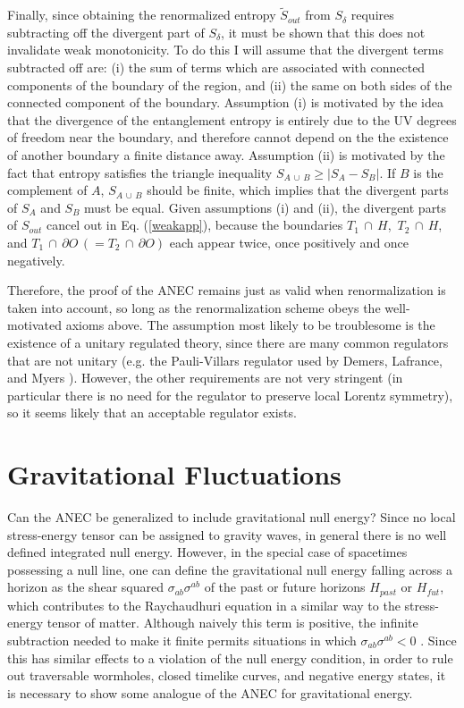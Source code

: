 \documentclass{article}
\begin{document}
Finally, since obtaining the renormalized entropy $\tilde{S}_{out}$ from $S_\delta$ requires subtracting off the divergent part of $S_\delta$, it must be shown that this does not invalidate weak monotonicity.  To do this I will assume that the divergent terms subtracted off are: (i) the sum of terms which are associated with connected components of the boundary of the region, and (ii) the same on both sides of the connected component of the boundary.  Assumption (i) is motivated by the idea that the divergence of the entanglement entropy is entirely due to the UV degrees of freedom near the boundary, and therefore cannot depend on the the existence of another boundary a finite distance away.  Assumption (ii) is motivated by the fact that entropy satisfies the triangle inequality $S_{A\,\cup\,B} \ge |S_A - S_B|$.  If $B$ is the complement of $A$, $S_{A\,\cup\,B}$ should be finite, which implies that the divergent parts of $S_A$ and $S_B$ must be equal.  Given assumptions (i) and (ii), the divergent parts of $S_{out}$ cancel out in Eq. (\ref{weakapp}), because the boundaries $T_1\,\cap\,H$, $\,T_2\,\cap\,H$, and $T_1\,\cap\,\partial O\,(= T_2\,\cap\,\partial O)$ each appear twice, once positively and once negatively.

Therefore, the proof of the ANEC remains just as valid when renormalization is taken into account, so long as the renormalization scheme obeys the well-motivated axioms above.  The assumption most likely to be troublesome is the existence of a unitary regulated theory, since there are many common regulators that are not unitary (e.g. the Pauli-Villars regulator used by Demers, Lafrance, and Myers \cite{FS94}).   However, the other requirements are not very stringent (in particular there is no need for the regulator to preserve local Lorentz symmetry), so it seems likely that an acceptable regulator exists.

\section{Gravitational Fluctuations}\label{graviton}

Can the ANEC be generalized to include gravitational null energy?  Since no local stress-energy tensor can be assigned to gravity waves, in general there is no well defined integrated null energy.  However, in the special case of spacetimes possessing a null line, one can define the gravitational null energy falling across a horizon as the shear squared $\sigma_{ab}\sigma^{ab}$ of the past or future horizons $H_{past}$ or $H_{fut}$, which contributes to the Raychaudhuri equation in a similar way to the stress-energy tensor of matter.  Although naively this term is positive, the infinite subtraction needed to make it finite permits situations in which $\sigma_{ab}\sigma^{ab} < 0$ \cite{CS77}.  Since this has similar effects to a violation of the null energy condition, in order to rule out traversable wormholes, closed timelike curves, and negative energy states, it is necessary to show some analogue of the ANEC for gravitational energy.
\end{document}
